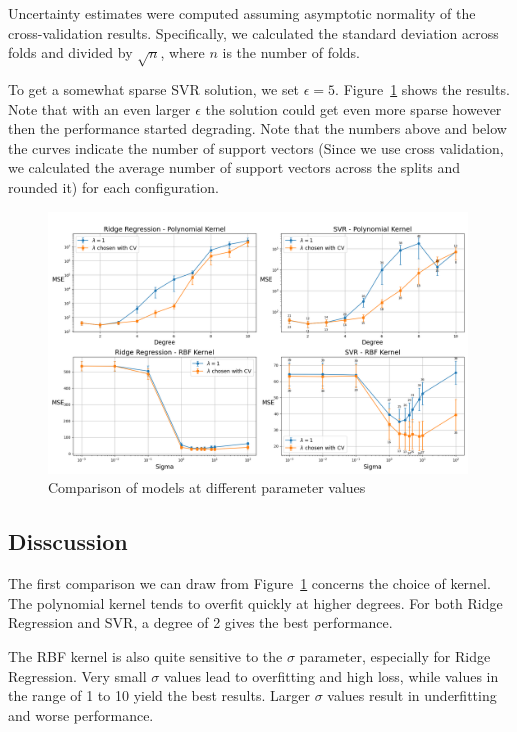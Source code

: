 \documentclass[9pt]{IEEEtran}
\begin{document}
Uncertainty estimates were computed assuming asymptotic normality of 
the cross-validation results. Specifically, we calculated the standard 
deviation across folds and divided by \(\sqrt{n}\), where \(n\) is 
the number of folds.

To get a somewhat sparse SVR solution, we set \(\epsilon = 5\).  
Figure~\ref{fig:part2} shows the results. Note that with an even larger $\epsilon$ 
the solution could get even more sparse however then the performance started degrading.
 Note that the numbers above and below the 
curves indicate the number of support vectors (Since we use cross validation, we calculated the 
average number of support vectors across the splits and rounded it) for each configuration.


\vspace{20pt}
\begin{figure}[H]
    \centering
    \includegraphics[width=0.99\textwidth]{figures/part2.png}
    \caption{Comparison of models at different parameter values}
    \label{fig:part2}
\end{figure}


\newpage
\subsection{Disscussion}
The first comparison we can draw from Figure~\ref{fig:part2} concerns 
the choice of kernel. The polynomial kernel tends to overfit quickly
 at higher degrees. For both Ridge Regression and SVR, a degree of 2
  gives the best performance. 

The RBF kernel is also quite sensitive to the \(\sigma\) parameter, 
especially for Ridge Regression. Very small \(\sigma\) values lead to 
overfitting and high loss, while values in the range of 1 to 10 yield
 the best results. Larger \(\sigma\) values result in underfitting and 
 worse performance.
\end{document}
